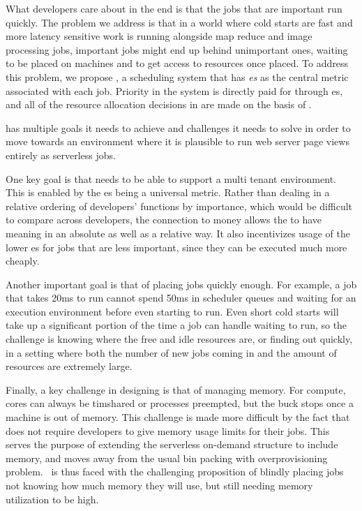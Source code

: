 What developers care about in the end is that the jobs that are important run
quickly. The problem we address is that in a world where cold starts are fast
and more latency sensitive work is running alongside map reduce and image
processing jobs, important jobs might end up behind unimportant ones, waiting to
be placed on machines and to get access to resources once placed. To address
this problem, we propose \sys{}, a scheduling system that has
\textit{\priceclass{}es} as the central metric associated with each job.
Priority in the system is directly paid for through \priceclass{}es, and all of
the resource allocation decisions in \sys{} are made on the basis of
\priceclass{}.

\Sys{} has multiple goals it needs to achieve and challenges it needs to solve
in order to move towards an environment where it is plausible to run web server
page views entirely as serverless jobs.

One key goal is that \sys{} needs to be able to support a multi tenant
environment. This is enabled by the \priceclass{}es being a universal metric.
Rather than dealing in a relative ordering of developers' functions by
importance, which would be difficult to compare across developers, the
connection to money allows the \class{} to have meaning in an absolute as well
as a relative way. It also incentivizes usage of the lower \class{}es for jobs
that are less important, since they can be executed much more cheaply.


Another important goal is that of placing jobs quickly enough. For example, a
job that takes 20ms to run cannot spend 50ms in scheduler queues and waiting for
an execution environment before even starting to run. Even short cold starts
will take up a significant portion of the time a job can handle waiting to run,
so the challenge is knowing where the free and idle resources are, or finding
out quickly, in a setting where both the number of new jobs coming in and the
amount of resources are extremely large.


Finally, a key challenge in designing \sys{} is that of managing memory. For
compute, cores can always be timshared or processes preempted, but the buck
stops once a machine is out of memory. This challenge is made more difficult by
the fact that \sys{} does not require developers to give memory usage limits for
their jobs. This serves the purpose of extending the serverless on-demand
structure to include memory, and moves away from the usual bin packing with
overprovisioning problem.~\Sys{} is thus faced with the challenging proposition
of blindly placing jobs not knowing how much memory they will use, but still
needing memory utilization to be high.
 
